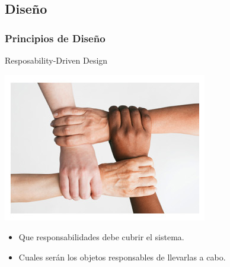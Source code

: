   \subsection{Diseño}
      \begin{frame}\frametitle{\textbf{Principios de Diseño}}
          \begin{block}{Resposability-Driven Design}
              \begin{minipage}{2cm \textwidth}
                  \includegraphics[scale=.2]{images/manos.jpg}
              \end{minipage}
              \begin{minipage}{8cm}
                  \begin{itemize}
                    \item Que responsabilidades debe cubrir el sistema.
                    \item Cuales serán los objetos responsables de llevarlas a cabo.                    
                  \end{itemize}                  
              \end{minipage}           
          \end{block}  


\end{frame}
